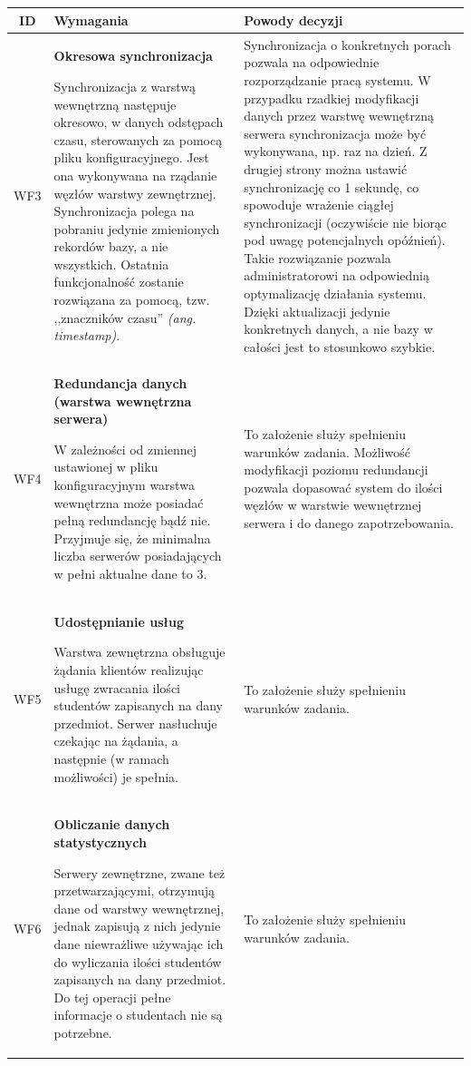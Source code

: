 \begin{tabularx}{\textwidth}{|c|X|X|}
\hline
\textbf{ID} & \textbf{Wymagania}  & \textbf{Powody decyzji} \\
\hline

\label{z:WF3} WF3 & \textbf{Okresowa synchronizacja}

 Synchronizacja z warstwą wewnętrzną następuje okresowo, w danych odstępach czasu, sterowanych za pomocą pliku konfiguracyjnego. Jest ona wykonywana na rządanie węzłów warstwy zewnętrznej. Synchronizacja polega na pobraniu jedynie zmienionych rekordów bazy, a nie wszystkich. Ostatnia funkcjonalność zostanie rozwiązana za pomocą, tzw. ,,znaczników czasu'' \textit{(ang. timestamp)}. & Synchronizacja o konkretnych porach pozwala na odpowiednie rozporządzanie pracą systemu. W przypadku rzadkiej modyfikacji danych przez warstwę wewnętrzną serwera synchronizacja może być wykonywana, np. raz na dzień. Z drugiej strony można ustawić synchronizację co 1 sekundę, co spowoduje wrażenie ciągłej synchronizacji (oczywiście nie biorąc pod uwagę potencjalnych opóźnień). Takie rozwiązanie pozwala administratorowi na odpowiednią optymalizację działania systemu. Dzięki aktualizacji jedynie konkretnych danych, a nie bazy w całości jest to stosunkowo szybkie. \\
\hline

\label{z:WF4} WF4 & \textbf{Redundancja danych (warstwa wewnętrzna serwera)}

W zależności od zmiennej ustawionej w pliku konfiguracyjnym warstwa wewnętrzna może posiadać pełną redundancję bądź nie. Przyjmuje się, że minimalna liczba serwerów posiadających w pełni aktualne dane to 3. & To założenie służy spełnieniu warunków zadania. Możliwość modyfikacji poziomu redundancji pozwala dopasować system do ilości węzłów w warstwie wewnętrznej serwera i do danego zapotrzebowania.\\
\hline

\label{z:WF5} WF5 & \textbf{Udostępnianie usług }

 Warstwa zewnętrzna obsługuje żądania klientów realizując usługę zwracania ilości studentów zapisanych na dany przedmiot. Serwer nasłuchuje czekając na żądania, a następnie (w ramach możliwości) je spełnia. & To założenie służy spełnieniu warunków zadania. \\
\hline



\label{z:WF6} WF6 & \textbf{Obliczanie danych statystycznych }

  Serwery zewnętrzne, zwane też przetwarzającymi, otrzymują dane od warstwy wewnętrznej, jednak zapisują z nich jedynie dane niewrażliwe używając ich do wyliczania ilości studentów zapisanych na dany przedmiot. Do tej operacji pełne informacje o studentach nie są potrzebne. & 
To założenie służy spełnieniu warunków zadania. \\
\hline

\end{tabularx}
